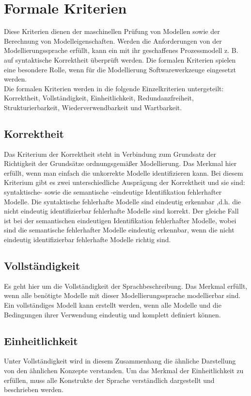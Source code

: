 \section{Formale Kriterien}  
Diese Kriterien dienen der maschinellen Prüfung von Modellen sowie der Berechnung von Modelleigenschaften. Werden die Anforderungen von der Modellierungssprache erfüllt, kann ein mit ihr geschaffenes Prozessmodell z. B. auf syntaktische Korrektheit überprüft werden. Die formalen Kriterien spielen eine besondere Rolle, wenn für die Modellierung Softwarewerkzeuge eingesetzt werden.\cite{MT007}\\
Die formalen Kriterien werden in die folgende Einzelkriterien untergeteilt:  Korrektheit, Vollständigkeit, Einheitlichkeit, Redundanzfreiheit, Strukturierbarkeit, Wiederverwendbarkeit und Wartbarkeit.
\subsection{Korrektheit}
Das Kriterium der Korrektheit steht in Verbindung zum Grundsatz der Richtigkeit der Grundsätze ordnungsgemäßer Modellierung.
Das Merkmal hier erfüllt, wenn man einfach die unkorrekte Modelle identifizieren kann.
Bei diesem Kriterium gibt es zwei unterschiedliche Ausprägung der Korrektheit und sie sind: syntaktische- sowie die semantische -eindeutige Identifikation fehlerhafter Modelle. 
Die syntaktische fehlerhafte Modelle sind eindeutig erkennbar ,d.h. die nicht eindeutig identifizierbar fehlerhafte Modelle sind korrekt. Der gleiche Fall ist bei der semantischen eindeutigen Identifikation fehlerhafter Modelle, wobei sind die semantische fehlerhafter Modelle eindeutig erkennbar, wenn die nicht eindeutig identifizierbar fehlerhafte Modelle richtig sind.
\subsection{Vollständigkeit}
Es geht hier um die Vollständigkeit der Sprachbeschreibung. Das Merkmal erfüllt, wenn alle benötigte Modelle mit dieser Modellierungssprache modellierbar sind.
Ein vollständiges Modell kann erstellt werden, wenn alle Modelle und die Bedingungen ihrer Verwendung eindeutig und komplett definiert können.
\subsection{Einheitlichkeit}
Unter Vollständigkeit wird in diesem Zusammenhang die ähnliche Darstellung von den ähnlichen Konzepte verstanden.
Um das Merkmal der Einheitlichkeit zu erfüllen, muss alle Konstrukte der Sprache verständlich dargestellt und beschrieben werden.
